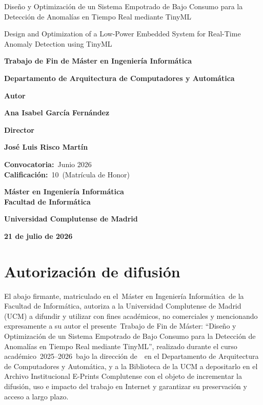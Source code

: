 \documentclass[11pt,a4paper]{book}
\newcommand{\miAutor}{Ana Isabel García Fernández}
\newcommand{\miDirector}{José Luis Risco Martín}
\newcommand{\miTituloES}{Diseño y Optimización de un Sistema Empotrado de Bajo Consumo para la Detección de Anomalías en Tiempo Real mediante TinyML}
\newcommand{\miTituloEN}{Design and Optimization of a Low-Power Embedded System for Real-Time Anomaly Detection using TinyML}
\newcommand{\miTFX}{Trabajo de Fin de Máster}
\newcommand{\miCurso}{2025--2026}
\newcommand{\misEstudios}{Máster en Ingeniería Informática}
\newcommand{\miTFXyEstudios}{Trabajo de Fin de Máster en Ingeniería Informática}
\newcommand{\miDepartamento}{Departamento de Arquitectura de Computadores y Automática}
\newcommand{\miConvocatoria}{Junio 2026}
\newcommand{\miNota}{10}
\newcommand{\miCalificacion}{Matrícula de Honor}
\newcommand{\miFecha}{21 de julio de 2026}
\begin{document}
\cleardoublepage
\thispagestyle{empty}
\begin{center}
\vspace*{1cm}

{\Huge {\miTituloES}} \\
{\Huge {\miTituloEN} \par}

\vspace*{2.5cm}

{\large \textbf{\miTFXyEstudios}} \\
{\large \textbf{\miDepartamento} \par}

\vspace{1cm}

{\Large \textbf{Autor}} \\
{\large \textbf{\miAutor} \par}

\vspace{0.50cm}

{\Large \textbf{Director}} \\
{\large \textbf{\miDirector} \par}

\vspace{0.75cm}\vfill

{\large \textbf{Convocatoria:}~\miConvocatoria}\\
{\large \textbf{Calificación:}~\miNota~(\miCalificacion)}

\vspace{1.00cm}\vfill

{\large \textbf{\misEstudios}}\\
{\large \textbf{Facultad de Informática}}\\
{\large \textbf{Universidad Complutense de Madrid} \par}
{\large \textbf{\miFecha}}
\end{center}

\chapter*{Autorización de difusión}
El abajo firmante, matriculado en el~\misEstudios~de la Facultad de Informática, autoriza a la Universidad Complutense de Madrid (UCM) a difundir y utilizar con fines académicos, no comerciales y mencionando expresamente a su autor el presente~\miTFX: ``\miTituloES'', realizado durante el curso académico~\miCurso~bajo la dirección de~\miDirectorInline~en el \miDepartamento, y a la Biblioteca de la UCM a depositarlo en el Archivo Institucional E-Prints Complutense con el objeto de incrementar la difusión, uso e impacto del trabajo en Internet y garantizar su preservación y acceso a largo plazo.
\end{document}
